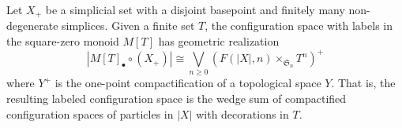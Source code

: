 \documentclass[10pt,a4paper]{amsart}
\newcommand{\SymGroup}[1][n]{\mathfrak{S}_{#1}}
\begin{document}
\begin{claim}\label{geometric-realization-labeled}
Let $X_+$ be a simplicial set with a disjoint basepoint and finitely many non-degenerate simplices. Given a finite set $T$, the configuration space with labels in the square-zero monoid $M[T]$ has geometric realization 
\begin{equation*}
|M[T]_{\bullet}\circ (X_+)| \cong  \bigvee_{n\geq 0} \left(F(|X|,n)\times_{\SymGroup[n]} T^n   \right)^+
\end{equation*}
where $Y^+$ is the one-point compactification of a topological space $Y$. That is, the resulting labeled configuration space is the wedge sum of compactified configuration spaces of particles in $|X|$ with decorations in $T$.
\end{claim}
\end{document}
